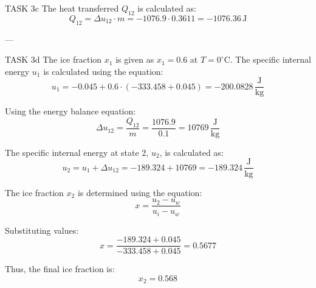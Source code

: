 TASK 3c  
The heat transferred \( Q_{12} \) is calculated as:  
\[
Q_{12} = \Delta u_{12} \cdot m = -1076.9 \cdot 0.3611 = -1076.36 \, \text{J}
\]

---

TASK 3d  
The ice fraction \( x_1 \) is given as \( x_1 = 0.6 \) at \( T = 0^\circ \text{C} \).  
The specific internal energy \( u_1 \) is calculated using the equation:  
\[
u_1 = -0.045 + 0.6 \cdot (-333.458 + 0.045) = -200.0828 \, \frac{\text{J}}{\text{kg}}
\]

Using the energy balance equation:  
\[
\Delta u_{12} = \frac{Q_{12}}{m} = \frac{1076.9}{0.1} = 10769 \, \frac{\text{J}}{\text{kg}}
\]

The specific internal energy at state 2, \( u_2 \), is calculated as:  
\[
u_2 = u_1 + \Delta u_{12} = -189.324 + 10769 = -189.324 \, \frac{\text{J}}{\text{kg}}
\]

The ice fraction \( x_2 \) is determined using the equation:  
\[
x = \frac{u_2 - u_w}{u_i - u_w}
\]

Substituting values:  
\[
x = \frac{-189.324 + 0.045}{-333.458 + 0.045} = 0.5677
\]

Thus, the final ice fraction is:  
\[
x_2 = 0.568
\]